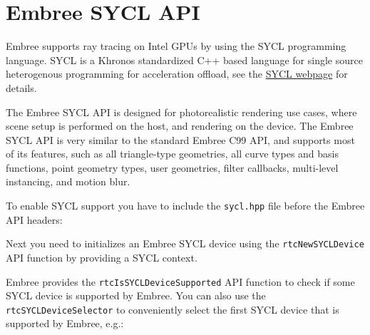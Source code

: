 \chapter{Embree SYCL API}\label{embree-sycl-api}

Embree supports ray tracing on Intel GPUs by using the SYCL programming
language. SYCL is a Khronos standardized C++ based language for single
source heterogenous programming for acceleration offload, see the
\href{https://www.khronos.org/sycl/}{SYCL webpage} for details.

The Embree SYCL API is designed for photorealistic rendering use cases,
where scene setup is performed on the host, and rendering on the device.
The Embree SYCL API is very similar to the standard Embree C99 API, and
supports most of its features, such as all triangle-type geometries, all
curve types and basis functions, point geometry types, user geometries,
filter callbacks, multi-level instancing, and motion blur.

To enable SYCL support you have to include the \texttt{sycl.hpp} file
before the Embree API headers:

\begin{Shaded}
\begin{Highlighting}[]
\end{Highlighting}
\end{Shaded}

Next you need to initializes an Embree SYCL device using the
\texttt{rtcNewSYCLDevice} API function by providing a SYCL context.

Embree provides the \texttt{rtcIsSYCLDeviceSupported} API function to
check if some SYCL device is supported by Embree. You can also use the
\texttt{rtcSYCLDeviceSelector} to conveniently select the first SYCL
device that is supported by Embree, e.g.:

\begin{Shaded}
\begin{Highlighting}[]
\OperatorTok{::}\OperatorTok{(}\OperatorTok{);}
\OperatorTok{::}\OperatorTok{(}\OperatorTok{,}\OperatorTok{);}
\OperatorTok{::}\OperatorTok{(}\OperatorTok{);}
\OperatorTok{=}\OperatorTok{(}\OperatorTok{,}\OperatorTok{);}
\end{Highlighting}
\end{Shaded}

